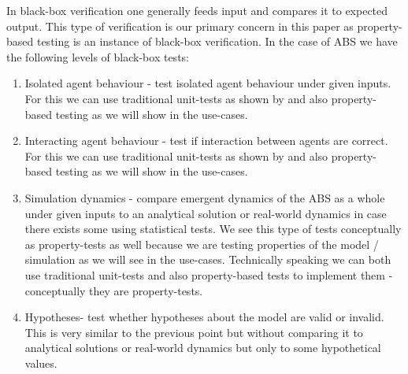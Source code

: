 In black-box verification one generally feeds input and compares it to expected output. This type of verification is our primary concern in this paper as property-based testing is an instance of black-box verification. In the case of ABS we have the following levels of black-box tests:
\begin{enumerate}
	\item Isolated agent behaviour - test isolated agent behaviour under given inputs. For this we can use traditional unit-tests as shown by \cite{collier_test-driven_2013} and also property-based testing as we will show in the use-cases.
	\item Interacting agent behaviour - test if interaction between agents are correct. For this we can use traditional unit-tests as shown by \cite{collier_test-driven_2013} and also property-based testing as we will show in the use-cases.
	\item Simulation dynamics - compare emergent dynamics of the ABS as a whole under given inputs to an analytical solution or real-world dynamics in case there exists some using statistical tests. We see this type of tests conceptually as property-tests as well because we are testing properties of the model / simulation as we will see in the use-cases. Technically speaking we can both use traditional unit-tests and also property-based tests to implement them - conceptually they are property-tests.
	\item Hypotheses- test whether hypotheses about the model are valid or invalid. This is very similar to the previous point but without comparing it to analytical solutions or real-world dynamics but only to some hypothetical values.
\end{enumerate}



